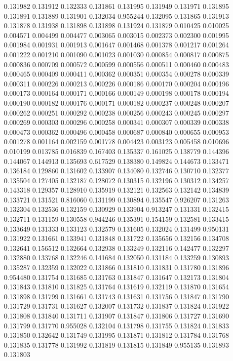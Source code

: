 0.131982
0.131912
0.132333
0.131861
0.131995
0.131949
0.131971
0.131895
0.131891
0.131889
0.131901
0.132034
0.955244
0.132095
0.131865
0.131913
0.131878
0.131938
0.131898
0.131898
0.131924
0.131879
0.010425
0.010025
0.004571
0.004499
0.004477
0.003065
0.003015
0.002373
0.002300
0.001995
0.001984
0.001931
0.001913
0.001647
0.001468
0.001378
0.001217
0.001264
0.001222
0.001210
0.001090
0.001023
0.001030
0.000854
0.000817
0.000875
0.000836
0.000709
0.000572
0.000599
0.000556
0.000511
0.000460
0.000483
0.000465
0.000409
0.000411
0.000362
0.000351
0.000354
0.000278
0.000339
0.000311
0.000226
0.000213
0.000226
0.000186
0.000170
0.000204
0.000196
0.000173
0.000164
0.000171
0.000166
0.000149
0.000198
0.000178
0.000194
0.000190
0.000182
0.000176
0.000171
0.000182
0.000237
0.000248
0.000207
0.000262
0.000251
0.000292
0.000238
0.000256
0.000243
0.000245
0.000297
0.000269
0.000303
0.000296
0.000258
0.000341
0.000307
0.000339
0.000338
0.000473
0.000362
0.000496
0.000458
0.000687
0.000840
0.000655
0.000953
0.001278
0.001164
0.002159
0.001778
0.004423
0.003123
0.005458
0.010696
0.010199
0.013785
0.016839
0.167403
0.135337
0.161025
0.138779
0.144396
0.144067
0.144913
0.135693
0.617529
0.138380
0.149824
0.144673
0.133471
0.136184
0.129860
0.131602
0.133907
0.134080
0.132746
0.130710
0.132377
0.135504
0.127405
0.132187
0.128072
0.130315
0.132196
0.130312
0.134257
0.143318
0.129357
0.128910
0.135919
0.132121
0.132563
0.132142
0.134839
0.133721
0.131521
0.816060
0.131199
0.130894
0.135547
0.926207
0.131263
0.132304
0.132536
0.132159
0.130929
0.133904
0.913247
0.131331
0.132415
0.132711
0.131159
0.130558
0.944246
0.135391
0.154159
0.132581
0.133415
0.133649
0.131333
0.133123
0.132579
0.131605
0.132024
0.131499
0.950131
0.131922
0.131661
0.133941
0.131848
0.131722
0.135656
0.132156
0.134708
0.132641
0.156512
0.132664
0.132938
0.133249
0.132116
0.142477
0.132297
0.132880
0.133768
0.132246
0.141684
0.132050
0.131184
0.133259
0.130893
0.135287
0.132359
0.132022
0.131866
0.131810
0.131831
0.131780
0.131896
0.954480
0.131754
0.131685
0.131763
0.131847
0.131647
0.132173
0.131804
0.131843
0.131810
0.131825
0.131764
0.131619
0.132119
0.131870
0.131654
0.131898
0.131799
0.131661
0.131743
0.131631
0.131756
0.131847
0.131790
0.131729
0.131731
0.131627
0.132007
0.131732
0.131837
0.131824
0.131922
0.131808
0.131840
0.131711
0.131907
0.131847
0.131806
0.131727
0.131690
0.131799
0.131770
0.955028
0.132104
0.131798
0.131755
0.131824
0.131833
0.131850
0.132642
0.131749
0.131995
0.131871
0.131812
0.131784
0.131768
0.131835
0.131778
0.131992
0.131819
0.131815
0.131849
0.955135
0.131893
0.131803
